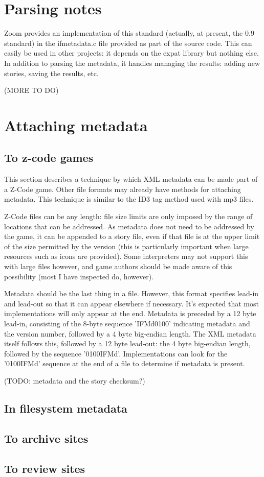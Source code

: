\documentclass[a4paper,11pt]{article}
\begin{document}
\section{Parsing notes}

Zoom provides an implementation of this standard (actually, at present, the 0.9 standard) in
the ifmetadata.c file provided as part of the source code. This can easily be used in other
projects: it depends on the expat library but nothing else. In addition to parsing the metadata,
it handles managing the results: adding new stories, saving the results, etc.

(MORE TO DO)

\section{Attaching metadata}

\subsection{To z-code games}

This section describes a technique by which XML metadata can be made part of a Z-Code
game. Other file formats may already have methods for attaching metadata. This technique
is similar to the ID3 tag method used with mp3 files.

Z-Code files can be any length: file size limits are only imposed by the range of locations
that can be addressed. As metadata does not need to be addressed by the game, it can be
appended to a story file, even if that file is at the upper limit of the size permitted by the
version (this is particularly important when large resources such as icons are provided).
Some interpreters may not support this with large files however, and game authors should
be made aware of this possibility (most I have inspected do, however).

Metadata should be the last thing in a file. However, this format specifies lead-in and 
lead-out so that it can appear elsewhere if necessary. It's expected that most implementations
will only appear at the end. Metadata is preceded by a 12 byte lead-in, consisting of
the 8-byte sequence 'IFMd0100' indicating metadata and the version number, followed
by a 4 byte big-endian length. The XML metadata itself follows this, followed by a 12
byte lead-out: the 4 byte big-endian length, followed by the sequence '0100IFMd'.
Implementations can look for the '0100IFMd' sequence at the end of a file to determine
if metadata is present.

(TODO: metadata and the story checksum?)

\subsection{In filesystem metadata}

\subsection{To archive sites}

\subsection{To review sites}
\end{document}
